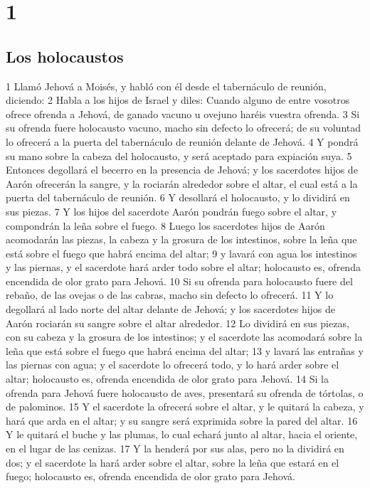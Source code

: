 

\chapter{1}

\section*{Los holocaustos}

1 Llamó Jehová a Moisés, y habló con él desde el tabernáculo de reunión, diciendo:
2 Habla a los hijos de Israel y diles: Cuando alguno de entre vosotros ofrece ofrenda a Jehová, de ganado vacuno u ovejuno haréis vuestra ofrenda.
3 Si su ofrenda fuere holocausto vacuno, macho sin defecto lo ofrecerá; de su voluntad lo ofrecerá a la puerta del tabernáculo de reunión delante de Jehová.
4 Y pondrá su mano sobre la cabeza del holocausto, y será aceptado para expiación suya.
5 Entonces degollará el becerro en la presencia de Jehová; y los sacerdotes hijos de Aarón ofrecerán la sangre, y la rociarán alrededor sobre el altar, el cual está a la puerta del tabernáculo de reunión.
6 Y desollará el holocausto, y lo dividirá en sus piezas.
7 Y los hijos del sacerdote Aarón pondrán fuego sobre el altar, y compondrán la leña sobre el fuego.
8 Luego los sacerdotes hijos de Aarón acomodarán las piezas, la cabeza y la grosura de los intestinos, sobre la leña que está sobre el fuego que habrá encima del altar;
9 y lavará con agua los intestinos y las piernas, y el sacerdote hará arder todo sobre el altar; holocausto es, ofrenda encendida de olor grato para Jehová.
10 Si su ofrenda para holocausto fuere del rebaño, de las ovejas o de las cabras, macho sin defecto lo ofrecerá.
11 Y lo degollará al lado norte del altar delante de Jehová; y los sacerdotes hijos de Aarón rociarán su sangre sobre el altar alrededor.
12 Lo dividirá en sus piezas, con su cabeza y la grosura de los intestinos; y el sacerdote las acomodará sobre la leña que está sobre el fuego que habrá encima del altar;
13 y lavará las entrañas y las piernas con agua; y el sacerdote lo ofrecerá todo, y lo hará arder sobre el altar; holocausto es, ofrenda encendida de olor grato para Jehová.
14 Si la ofrenda para Jehová fuere holocausto de aves, presentará su ofrenda de tórtolas, o de palominos.
15 Y el sacerdote la ofrecerá sobre el altar, y le quitará la cabeza, y hará que arda en el altar; y su sangre será exprimida sobre la pared del altar.
16 Y le quitará el buche y las plumas, lo cual echará junto al altar, hacia el oriente, en el lugar de las cenizas.
17 Y la henderá por sus alas, pero no la dividirá en dos; y el sacerdote la hará arder sobre el altar, sobre la leña que estará en el fuego; holocausto es, ofrenda encendida de olor grato para Jehová.

